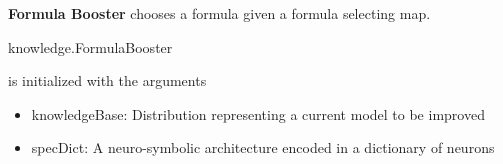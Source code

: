 \textbf{Formula Booster} chooses a formula given a formula selecting map.
\begin{centeredcode}
	knowledge.FormulaBooster
\end{centeredcode}
is initialized with the arguments
\begin{itemize}
	\item knowledgeBase: Distribution representing a current model to be improved
	\item specDict: A neuro-symbolic architecture encoded in a dictionary of neurons
\end{itemize}








%




